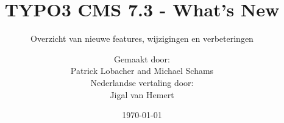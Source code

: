 %
%
%

\documentclass[t]{beamer}

\beamertemplatenavigationsymbolsempty

{
	\usetheme{typo3slides}
}

\title{TYPO3 CMS 7.3 - What's New}
\subtitle{Overzicht van nieuwe features, wijzigingen en verbeteringen}
\author{
	\centerline{Gemaakt door:}
	\centerline{Patrick Lobacher and Michael Schams}
	\vspace{0.4cm}
	\centerline{Nederlandse vertaling door:}
	\centerline{Jigal van Hemert}
}

\date{\today}



\sharefont


\begingroup
	[default]
	\begin{frame}
		\titlepage
	\end{frame}
\endgroup


\section*{TYPO3 CMS 7.3 - What's New}
\begin{frame}[fragile]
	\frametitle{Overzicht hoofdstukken}
	\framesubtitle{Overzicht hoofdstukken}

	\begin{multicols}{2}
		\tableofcontents
	\end{multicols}

\end{frame}

